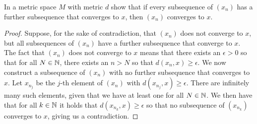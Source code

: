 \begin{exercise}{39}
In a metric space $M$ with metric $d$ show that if every subsequence of $(x_n)$ has a further subsequence that converges to $x$, then $(x_n)$ converges to $x$.
\end{exercise}
\begin{proof}
Suppose, for the sake of contradiction, that $(x_n)$ does not converge to $x$, but all subsequences of $(x_n)$ have a further subsequence that converge to $x$. The fact that $(x_n)$ does not converge to $x$ means that there exists an $\epsilon>0$ so that for all $N\in\mathbb{N}$, there exists an $n>N$ so that $d(x_n,x)\geq\epsilon$. We now construct a subsequence of $(x_n)$ with no further subsequence that converges to $x$. Let $x_{n_j}$ be the $j$-th element of $(x_n)$ with $d(x_{n_j},x)\geq\epsilon$. There are infinitely many such elements, given that we have at least one for all $N\in\mathbb{N}$. We then have that for all $k\in\mathbb{N}$ it holds that $d(x_{n_k},x)\geq\epsilon$ so that no subsequence of $(x_{n_k})$ converges to $x$, giving us a contradiction.
\end{proof} 

